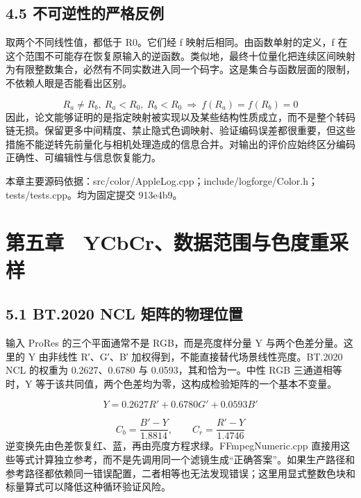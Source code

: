 \documentclass[UTF8,zihao=-4,openany]{ctexbook}
\begin{document}
\section*{4.5 不可逆性的严格反例}
取两个不同线性值，都低于 R0。它们经 f 映射后相同。由函数单射的定义，f 在这个范围不可能存在恢复原输入的逆函数。类似地，最终十位量化把连续区间映射为有限整数集合，必然有不同实数进入同一个码字。这是集合与函数层面的限制，不依赖人眼是否能看出区别。


\begin{equation}
R_a\neq R_b,\ R_a<R_0,\ R_b<R_0\ \Longrightarrow\ f(R_a)=f(R_b)=0
\end{equation}
因此，论文能够证明的是指定映射被实现以及某些结构性质成立，而不是整个转码链无损。保留更多中间精度、禁止隐式色调映射、验证编码误差都很重要，但这些措施不能逆转先前量化与相机处理造成的信息合并。对输出的评价应始终区分编码正确性、可编辑性与信息恢复能力。


\par\small 本章主要源码依据：src/color/AppleLog.cpp；include/logforge/Color.h；tests/tests.cpp。均为固定提交 913e4b9。\normalsize

\chapter*{第五章　YCbCr、数据范围与色度重采样}

\section*{5.1 BT.2020 NCL 矩阵的物理位置}
输入 ProRes 的三个平面通常不是 RGB，而是亮度样分量 Y 与两个色差分量。这里的 Y 由非线性 R′、G′、B′ 加权得到，不能直接替代场景线性亮度。BT.2020 NCL 的权重为 0.2627、0.6780 与 0.0593，其和恰为一。中性 RGB 三通道相等时，Y 等于该共同值，两个色差均为零，这构成检验矩阵的一个基本不变量。


\begin{equation}
Y=0.2627R'+0.6780G'+0.0593B'
\end{equation}

\begin{equation}
C_b=\frac{B'-Y}{1.8814},\qquad C_r=\frac{R'-Y}{1.4746}
\end{equation}
逆变换先由色差恢复红、蓝，再由亮度方程求绿。FFmpegNumeric.cpp 直接用这些等式计算独立参考，而不是先调用同一个滤镜生成“正确答案”。如果生产路径和参考路径都依赖同一错误配置，二者相等也无法发现错误；这里用显式整数色块和标量算式可以降低这种循环验证风险。
\end{document}
